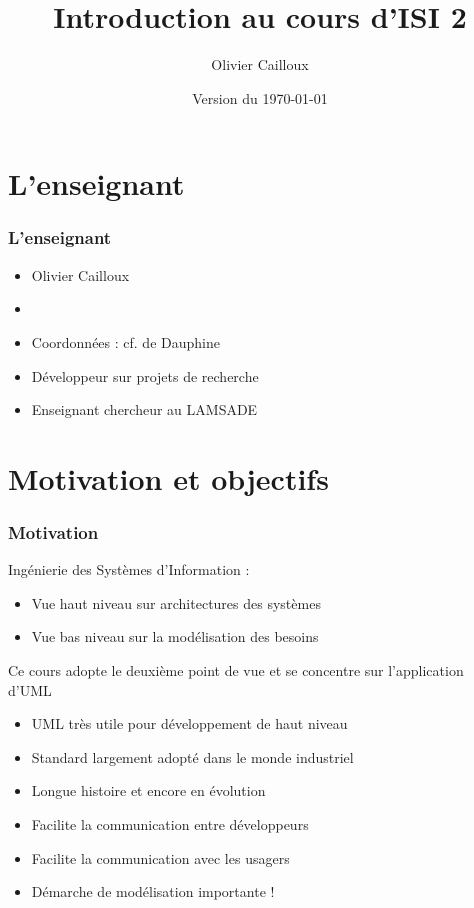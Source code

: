 \documentclass[french]{beamer}
\title{Introduction au cours d’ISI 2}
\author{Olivier Cailloux}
\institute[LAMSADE]{LAMSADE, Université Paris-Dauphine}
\date{Version du \today}
\begin{document}
\begin{frame}[plain]
	\titlepage
\end{frame}
\addtocounter{framenumber}{-1}

\section{L’enseignant}
\begin{frame}
	\frametitle{L’enseignant}
	\begin{itemize}
		\item Olivier Cailloux
		\item {}
		\item Coordonnées : cf.  de Dauphine 
		\item Développeur sur projets de recherche
		\item Enseignant chercheur au LAMSADE
	\end{itemize}
\end{frame}

\section{Motivation et objectifs}
\begin{frame}
	\frametitle{Motivation}
	Ingénierie des Systèmes d’Information : 
	\begin{itemize}
		\item Vue haut niveau sur architectures des systèmes 
		\item Vue bas niveau sur la modélisation des besoins
	\end{itemize}
	Ce cours adopte le deuxième point de vue et se concentre sur l’application d’UML
	\begin{itemize}
		\item UML très utile pour développement de haut niveau
		\item Standard largement adopté dans le monde industriel
		\item Longue histoire et encore en évolution
		\item Facilite la communication entre développeurs
		\item Facilite la communication avec les usagers
		\item Démarche de modélisation importante !
	\end{itemize}
\end{frame}
\end{document}
